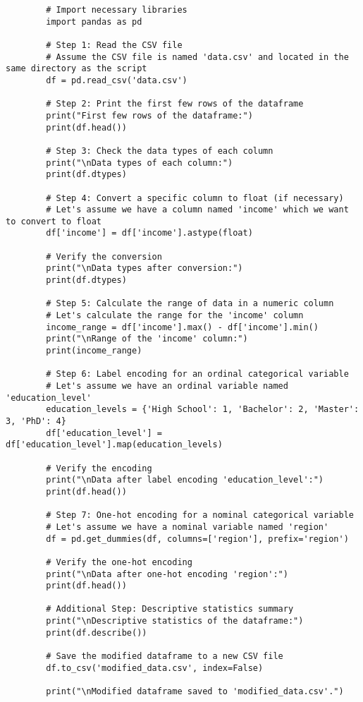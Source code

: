 \begin{verbatim}
        # Import necessary libraries
        import pandas as pd
        
        # Step 1: Read the CSV file
        # Assume the CSV file is named 'data.csv' and located in the same directory as the script
        df = pd.read_csv('data.csv')
        
        # Step 2: Print the first few rows of the dataframe
        print("First few rows of the dataframe:")
        print(df.head())
        
        # Step 3: Check the data types of each column
        print("\nData types of each column:")
        print(df.dtypes)
        
        # Step 4: Convert a specific column to float (if necessary)
        # Let's assume we have a column named 'income' which we want to convert to float
        df['income'] = df['income'].astype(float)
        
        # Verify the conversion
        print("\nData types after conversion:")
        print(df.dtypes)
        
        # Step 5: Calculate the range of data in a numeric column
        # Let's calculate the range for the 'income' column
        income_range = df['income'].max() - df['income'].min()
        print("\nRange of the 'income' column:")
        print(income_range)
        
        # Step 6: Label encoding for an ordinal categorical variable
        # Let's assume we have an ordinal variable named 'education_level'
        education_levels = {'High School': 1, 'Bachelor': 2, 'Master': 3, 'PhD': 4}
        df['education_level'] = df['education_level'].map(education_levels)
        
        # Verify the encoding
        print("\nData after label encoding 'education_level':")
        print(df.head())
        
        # Step 7: One-hot encoding for a nominal categorical variable
        # Let's assume we have a nominal variable named 'region'
        df = pd.get_dummies(df, columns=['region'], prefix='region')
        
        # Verify the one-hot encoding
        print("\nData after one-hot encoding 'region':")
        print(df.head())
        
        # Additional Step: Descriptive statistics summary
        print("\nDescriptive statistics of the dataframe:")
        print(df.describe())
        
        # Save the modified dataframe to a new CSV file
        df.to_csv('modified_data.csv', index=False)
        
        print("\nModified dataframe saved to 'modified_data.csv'.")        
\end{verbatim}

